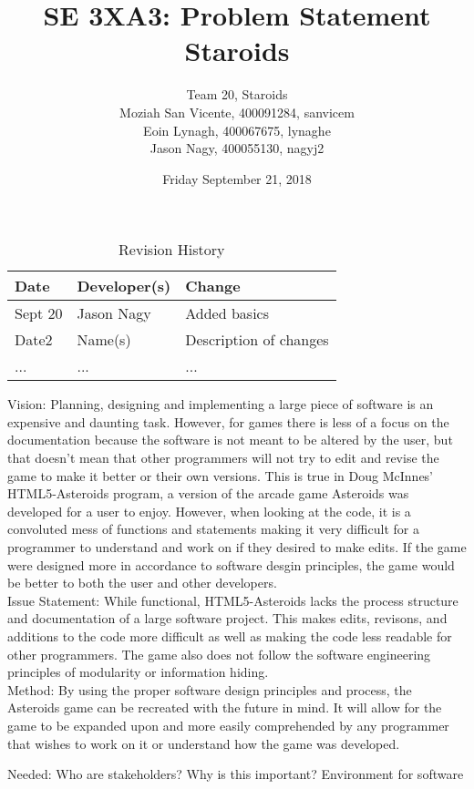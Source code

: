 \documentclass{article}
\title{SE 3XA3: Problem Statement\\Staroids}
\author{Team 20, Staroids
		\\ Moziah San Vicente, 400091284, sanvicem
		\\ Eoin Lynagh, 400067675, lynaghe
		\\ Jason Nagy, 400055130, nagyj2
}
\date{Friday September 21, 2018}
\begin{document}
\begin{table}[hp]
\caption{Revision History} \label{TblRevisionHistory}
\begin{tabularx}{\textwidth}{llX}
\toprule
\textbf{Date} & \textbf{Developer(s)} & \textbf{Change}\\
\midrule
Sept 20 & Jason Nagy & Added basics\\
Date2 & Name(s) & Description of changes\\
... & ... & ...\\
\bottomrule
\end{tabularx}
\end{table}

\newpage

\maketitle

Vision: Planning, designing and implementing a large piece of software is an expensive and
daunting task. However, for games there is less of a focus on the documentation because the
software is not meant to be altered by the user, but that doesn't mean that other programmers
will not try to edit and revise the game to make it better or their own versions.
This is true in Doug McInnes' HTML5-Asteroids program, a version of the arcade game Asteroids
was developed for a user to enjoy. However, when looking at the code, it is a convoluted mess of
functions and statements making it very difficult for a programmer to understand and work on
if they desired to make edits. If the game were designed more in accordance to software desgin
principles, the game would be better to both the user and other developers.
\\Issue Statement: While functional, HTML5-Asteroids lacks the process structure and
documentation of a large software project. This makes edits, revisons, and additions to the
code more difficult as well as making the code less readable for other programmers. The game
also does not follow the software engineering principles of modularity or information hiding.
\\Method: By using the proper software design principles and process, the Asteroids game can
be recreated with the future in mind. It will allow for the game to be expanded upon and more
easily comprehended by any programmer that wishes to work on it or understand how the game was
developed.

Needed:
Who are stakeholders?
Why is this important?
Environment for software





\end{document}

